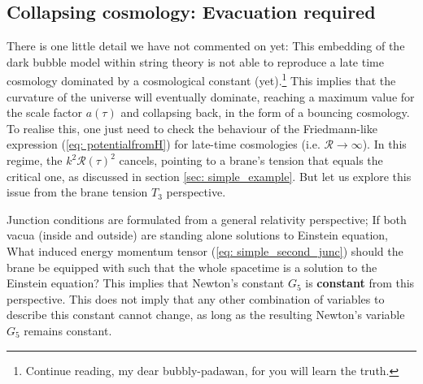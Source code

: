 \subsection{Collapsing cosmology: Evacuation required} 
There is one little detail we have not commented on yet: This embedding of the dark bubble model within string theory is not able to reproduce a late time cosmology dominated by a cosmological constant (yet).\footnote{Continue reading, my dear bubbly-padawan, for you will learn the truth.} This implies that the curvature of the universe will eventually dominate, reaching a maximum value for the scale factor $a(\tau)$ and collapsing back, in the form of a bouncing cosmology. To realise this, one just need to check the behaviour of the Friedmann-like expression (\ref{eq: potentialfromH}) for late-time cosmologies (i.e. $\mathcal{R} \rightarrow \infty$). In this regime, the $k^{2} \mathcal{R}(\tau)^{2}$ cancels, pointing to a brane's tension that equals the critical one, as discussed in section \ref{sec: simple_example}. But let us explore this issue from the brane tension $T_{3}$ perspective.

Junction conditions are formulated from a general relativity perspective; If both vacua (inside and outside) are standing alone solutions to Einstein equation, What induced energy momentum tensor (\ref{eq: simple_second_junc}) should the brane be equipped with such that the whole spacetime is a solution to the Einstein equation? This implies that Newton's constant $G_{5}$ is \textbf{constant} from this perspective. This does not imply that any other combination of variables to describe this constant cannot change, as long as the resulting Newton's variable $G_{5}$ remains constant.

